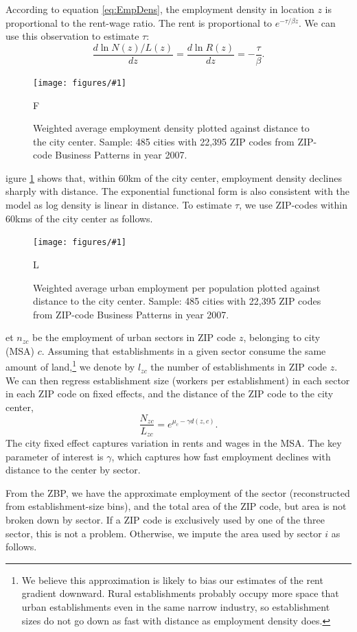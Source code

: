 \documentclass[12pt]{article}
\newcommand{\dofigure}[3]{\begin{figure}
\begin{centering}
\texttt{[image: figures/\#1]}
  \caption{#2\label{fig:#1}}
\end{centering}

\noindent \footnotesize{#3}
\end{figure}}
\begin{document}
According to equation \ref{eq:EmpDens}, the employment density in location $z$ is proportional to the rent-wage ratio. The rent is proportional to $e^{-\tau/\beta z}$. We can use this observation to estimate $\tau$:
\[
\frac{d\ln N(z)/L(z)}{dz} =\frac{d\ln R(z)}{dz} = -\frac{\tau}{\beta}.
\]
\dofigure{nonparametric_gradients}{Weighted average employment density plotted against distance to the city center. Sample: 485 cities with 22,395 ZIP codes from ZIP-code Business Patterns in year 2007.}

Figure \ref{fig:nonparametric_gradients} shows that, within 60km of the city center, employment density declines sharply with distance. The exponential functional form is also consistent with the model as log density is linear in distance. To estimate $\tau$, we use ZIP-codes within 60kms of the city center as follows.

\dofigure{urban_share}{Weighted average urban employment per population plotted against distance to the city center. Sample: 485 cities with 22,395 ZIP codes from ZIP-code Business Patterns in year 2007.}


Let $n_{zc}$ be the employment of urban sectors in ZIP code $z$, belonging to city (MSA) $c$.  Assuming that establishments in a given sector consume the same amount of land,\footnote{We believe this approximation is likely to bias our estimates of the rent gradient downward. Rural establishments probably occupy more space that urban establishments even in the same narrow industry, so establishment sizes do not go down as fast with distance as employment density does. } we denote by $l_{zc}$ the number of establishments in ZIP code $z$. We can then regress establishment size (workers per establishment) in each sector in each ZIP code on fixed effects, and the distance of the ZIP code to the city center,
\begin{equation}\label{eq:estimable:gradient}
\frac{N_{zc}}{L_{zc}} = e^{\mu_c-\gamma d(z,c)}.
\end{equation}
The city fixed effect captures variation in rents and wages in the MSA. %
The key parameter of interest is $\gamma$, which captures how fast employment declines with distance to the center by sector.


From the ZBP, we have the approximate employment of the sector (reconstructed from establishment-size bins), and the total area of the ZIP code, but area is not broken down by sector. If a ZIP code is exclusively used by one of the three sector, this is not a problem. Otherwise, we impute the area used by sector $i$ as follows.
\end{document}
